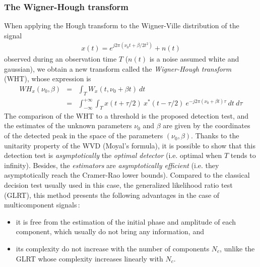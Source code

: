 \subsubsection{The Wigner-Hough transform}
When applying the Hough transform to the Wigner-Ville distribution of the
signal
\begin{eqnarray*}
x(t)=e^{j2\pi(\nu_0 t+\beta/2 t^2)} + n(t) 
\end{eqnarray*}
observed during an observation time $T$ ($n(t)$ is a noise assumed white
and gaussian), we obtain a new transform called the {\it Wigner-Hough
transform} (WHT), whose expression is
\begin{eqnarray}
\label{WHT}
WH_x(\nu_0,\beta) &=& \int_T W_x(t,\nu_0+\beta t)\ dt\\
 &=& \int_{-\infty}^{+\infty}\int_T x(t+\tau/2)\ x^*(t-\tau/2)\ 
	 e^{-j2\pi(\nu_0+\beta t)\tau}\ dt\ d\tau\nonumber
\end{eqnarray}
  The comparison of the WHT to a threshold is the proposed detection test,
and the estimates of the unknown parameters $\nu_0$ and $\beta$ are given
by the coordinates of the detected peak in the space of the parameters
$(\nu_0,\beta)$. Thanks to the unitarity property of the WVD (Moyal's
formula), it is possible to show that this detection test is {\it
asymptotically} the {\it optimal detector} (i.e. optimal when $T$ tends to
infinity). Besides, the {\it estimators} are {\it asymptotically efficient}
(i.e. they asymptotically reach the Cramer-Rao lower bounds).  Compared to
the classical decision test usually used in this case, the generalized
likelihood ratio test (GLRT), this method presents the following advantages
in the case of multicomponent signals\,:
\begin{itemize}
\item it is free from the estimation of the initial phase and amplitude
of each component, which usually do not bring any information, and
\item its complexity do not increase with the number of components $N_c$,
unlike the GLRT whose complexity increases linearly with $N_c$.
\end{itemize}

